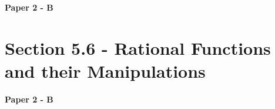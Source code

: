 \documentclass[12pt, a4paper]{article}
\begin{document}
\textbf{Paper 2 - B}
\begin{enumx}[label=\arabic*.,start=28]
\item {}\label{DSE2012-CoreP2-Q31} 
\item {}\label{DSE2013-CoreP2-Q31} 
\item {}\label{DSE2014-CoreP2-Q31} 
\item {}\label{DSE2016-CoreP2-Q31} 
\item {}\label{DSE2021-CoreP2-Q31} 
\item {}\label{DSE2023-CoreP2-Q32} 
\item {}\label{DSE2024-CoreP2-Q31} 
\end{enumx}




\section*{Section 5.6 - Rational Functions and their Manipulations \NF}\label{section:4-5-6}

\textbf{Paper 2 - B}
\begin{enumx}[label=\arabic*.,start=35]
\item {}\label{DSE2012S-CoreP2-Q31} 
\item {}\label{DSE2015-CoreP2-Q31} 
\end{enumx}
\end{document}

